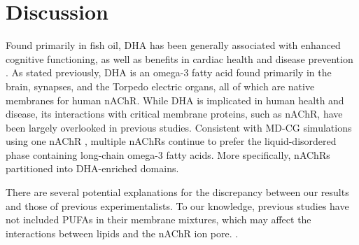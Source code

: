 \documentclass[final,3p,times,twocolumn]{elsarticle}
\begin{document}
\section{Discussion}


Found primarily in fish oil, DHA has been generally associated with enhanced cognitive functioning, as well as benefits in cardiac health and disease prevention \cite{12439486320170901, S000930840800032720080101, Georgieva2015}. 
As stated previously, DHA is an omega-3 fatty acid  found primarily in the brain, synapses, and the Torpedo electric organs, all of which are native membranes for human nAChR. While DHA is implicated in human health and disease, its interactions with critical membrane proteins, such as nAChR, have been largely overlooked in previous studies. Consistent with MD-CG simulations using one nAChR \cite{Sharp2018}, multiple nAChRs continue to prefer the liquid-disordered phase containing long-chain omega-3 fatty acids. More specifically, nAChRs partitioned into DHA-enriched domains. 




There are several potential explanations for the discrepancy between our results and those of previous experimentalists. To our knowledge, previous studies have not included PUFAs in their membrane mixtures, which may affect the interactions between lipids and the nAChR ion pore. \cite{Fong_Correlation_1986,Sunshine_Lipid_1992,Butler1993,Fong_Stabilization_1987,Corrie_Lipid_2002}. 
\end{document}
